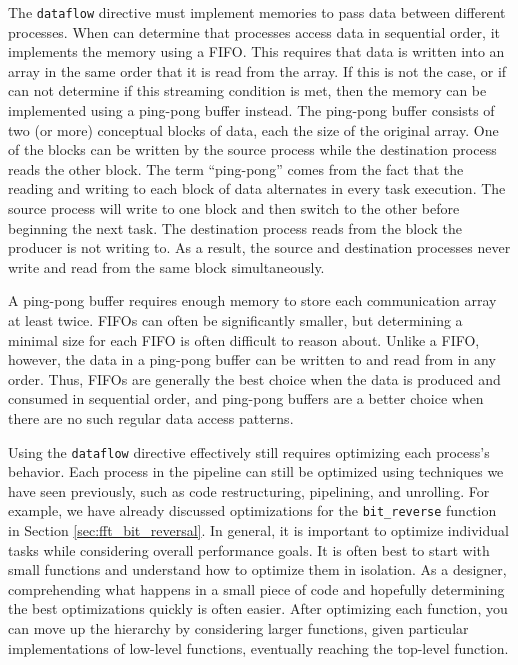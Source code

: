 The \lstinline{dataflow} directive must implement memories to pass data between different processes. When \VHLS can determine that processes access data in sequential order, it implements the memory using a FIFO. This requires that data is written into an array in the same order that it is read from the array.  If this is not the case, or if \VHLS can not determine if this streaming condition is met, then the memory can be implemented using a ping-pong buffer instead.   The ping-pong buffer consists of two (or more) conceptual blocks of data, each the size of the original array. One of the blocks can be written by the source process while the destination process reads the other block. The term ``ping-pong'' comes from the fact that the reading and writing to each block of data alternates in every task execution. The source process will write to one block and then switch to the other before beginning the next task. The destination process reads from the block the producer is not writing to. As a result, the source and destination processes never write and read from the same block simultaneously. 

A ping-pong buffer requires enough memory to store each communication array at least twice.   FIFOs can often be significantly smaller, but determining a minimal size for each FIFO is often difficult to reason about.  Unlike a FIFO, however, the data in a ping-pong buffer can be written to and read from in any order. Thus, FIFOs are generally the best choice when the data is produced and consumed in sequential order, and ping-pong buffers are a better choice when there are no such regular data access patterns.

Using the \lstinline{dataflow} directive effectively still requires optimizing each process's behavior. Each process in the pipeline can still be optimized using techniques we have seen previously, such as code restructuring, pipelining, and unrolling.  For example, we have already discussed optimizations for the \lstinline{bit_reverse} function in Section \ref{sec:fft_bit_reversal}.  In general, it is important to optimize individual tasks while considering overall performance goals. It is often best to start with small functions and understand how to optimize them in isolation. As a designer, comprehending what happens in a small piece of code and hopefully determining the best optimizations quickly is often easier. After optimizing each function, you can move up the hierarchy by considering larger functions, given particular implementations of low-level functions, eventually reaching the top-level function.

